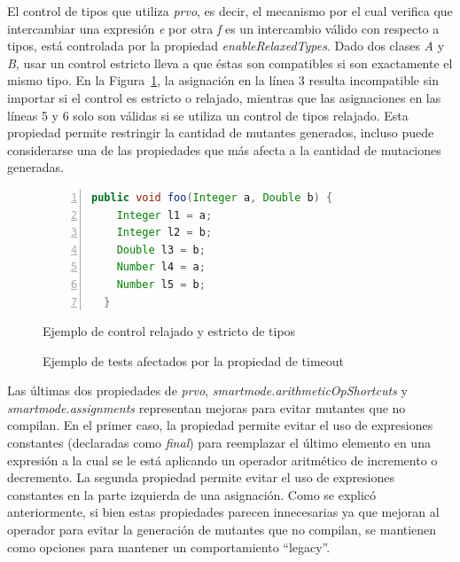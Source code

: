 El control de tipos que utiliza \emph{prvo}, es decir, el mecanismo por el cual verifica que intercambiar una expresi\'on \emph{e} por otra \emph{f} es un intercambio v\'alido con respecto a tipos, est\'a controlada por la propiedad \emph{enableRelaxedTypes}. Dado dos clases \emph{A} y \emph{B}, usar un control estricto lleva a que \'estas son compatibles si son exactamente el mismo tipo. En la Figura~\ref{figures.examples.operators.prvo.relaxedVsStrict}, la asignaci\'on en la l\'inea 3 resulta incompatible sin importar si el control es estricto o relajado, mientras que las asignaciones en las l\'ineas 5 y 6 solo son v\'alidas si se utiliza un control de tipos relajado. Esta propiedad permite restringir la cantidad de mutantes generados, incluso puede considerarse una de las propiedades que m\'as afecta a la cantidad de mutaciones generadas.

\begin{figure}
	\begin{lstlisting}[mathescape=true,language=Java,numbers=left,basicstyle={}]
  public void foo(Integer a, Double b) {
    Integer l1 = a;
    Integer l2 = b;
    Double l3 = b;
    Number l4 = a;
    Number l5 = b;
  }
	\end{lstlisting}
	\caption{Ejemplo de control relajado y estricto de tipos}
	\label{figures.examples.operators.prvo.relaxedVsStrict}
\end{figure}

\begin{figure}
	
	\caption{Ejemplo de tests afectados por la propiedad de timeout}
	\label{figures.examples.confFile.testTimeout}
\end{figure}

Las \'ultimas dos propiedades de \emph{prvo}, \emph{smartmode.arithmeticOpShortcuts} y \emph{smartmode.assignments} representan mejoras para evitar mutantes que no compilan. En el primer caso, la propiedad permite evitar el uso de expresiones constantes (declaradas como \emph{final}) para reemplazar el \'ultimo elemento en una expresi\'on a la cual se le est\'a aplicando un operador aritm\'etico de incremento o decremento. La segunda propiedad permite evitar el uso de expresiones constantes en la parte izquierda de una asignaci\'on. Como se explic\'o anteriormente, si bien estas propiedades parecen innecesarias ya que mejoran al operador para evitar la generaci\'on de mutantes que no compilan, se mantienen como opciones para mantener un comportamiento ``legacy''.

